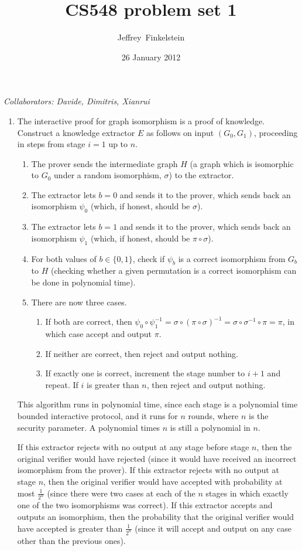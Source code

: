 \documentclass{article}
\author{Jef{}frey~Finkelstein}
\date{26 January 2012}
\title{CS548 problem set 1}
\newcommand{\collaborators}[1]{\emph{Collaborators: #1}}
\begin{document}
\maketitle
\collaborators{Davide, Dimitris, Xianrui}
\begin{enumerate}
\item
  The interactive proof for graph isomorphism is a proof of knowledge.
  Construct a knowledge extractor $E$ as follows on input $(G_0, G_1)$, proceeding in steps from stage $i=1$ up to $n$.
  \begin{enumerate}
  \item The prover sends the intermediate graph $H$ (a graph which is isomorphic to $G_0$ under a random isomorphism, $\sigma$) to the extractor.
  \item The extractor lets $b=0$ and sends it to the prover, which sends back an isomorphism $\psi_0$ (which, if honest, should be $\sigma$).
  \item The extractor lets $b=1$ and sends it to the prover, which sends back an isomorphism $\psi_1$ (which, if honest, should be $\pi\circ\sigma$).
  \item For both values of $b\in\{0,1\}$, check if $\psi_b$ is a correct isomorphism from $G_b$ to $H$ (checking whether a given permutation is a correct isomorphism can be done in polynomial time).
  \item
    There are now three cases.
    \begin{enumerate}
    \item If both are correct, then $\psi_0\circ\psi_1^{-1}=\sigma\circ(\pi\circ\sigma)^{-1}=\sigma\circ\sigma^{-1}\circ\pi=\pi$, in which case accept and output $\pi$.
    \item If neither are correct, then reject and output nothing.
    \item
      If exactly one is correct, increment the stage number to $i+1$ and repeat.
      If $i$ is greater than $n$, then reject and output nothing.
    \end{enumerate}
  \end{enumerate}
  This algorithm runs in polynomial time, since each stage is a polynomial time bounded interactive protocol, and it runs for $n$ rounds, where $n$ is the security parameter.
  A polynomial times $n$ is still a polynomial in $n$.

  If this extractor rejects with no output at any stage before stage $n$, then the original verifier would have rejected (since it would have received an incorrect isomorphism from the prover).
  If this extractor rejects with no output at stage $n$, then the original verifier would have accepted with probability at most $\frac{1}{2^n}$ (since there were two cases at each of the $n$ stages in which exactly one of the two isomorphisms was correct).
  If this extractor accepts and outputs an isomorphism, then the probability that the original verifier would have accepted is greater than $\frac{1}{2^n}$ (since it will accept and output on any case other than the previous ones).


\end{enumerate}
\end{document}
